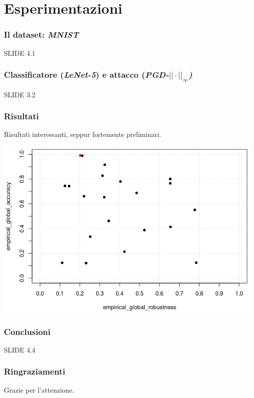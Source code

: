 \documentclass{beamer}
\begin{document}
\section{Esperimentazioni}{

\begin{frame}
	\frametitle{Il dataset: \textit{MNIST}}
	SLIDE 4.1
\end{frame}


\begin{frame}
	\frametitle{Classificatore (\textit{LeNet-5}) e attacco (\textit{PGD-${||\cdot||}_{\infty}$)}}
	SLIDE 3.2
\end{frame}


\begin{frame}
	\frametitle{Risultati}
	Risultati interessanti, seppur fortemente preliminari.
	\hfill\break

	\center \includegraphics[height=0.58\linewidth]{my-graph-scatterplot.png}

\end{frame}


\begin{frame}
	\frametitle{Conclusioni}
	SLIDE 4.4
\end{frame}

\begin{frame}
	\frametitle{Ringraziamenti}
	Grazie per l'attenzione.
\end{frame}

}

\end{document}
